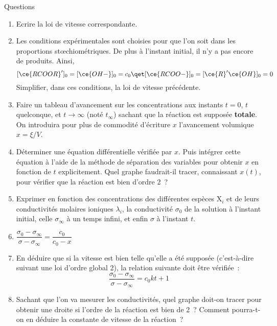 \documentclass[a4paper, 11pt, final, garamond]{book}
\begin{document}
\begin{rexem}{Questions}
    \begin{enumerate}[label=\sqenumi, start=4]
        \item Ecrire la loi de vitesse correspondante.
        \item Les conditions expérimentales sont choisies pour que l'on soit dans
            les proportions stœchiométriques. De plus à l'instant initial, il n'y a
            pas encore de produits. Ainsi, 
            \[[\ce{RCOOR}']_0 = [\ce{OH-}]_0 = c_0 \qet [\ce{RCOO-}]_0 = 
            [\ce{R}'\ce{OH}]_0 = 0\]
            Simplifier, dans ces conditions, la loi de vitesse précédente.
        \item Faire un tableau d'avancement sur les concentrations aux instants $t =
            0$, $t$ quelconque, et $t\to \infty$ (noté $t_\infty$) sachant que la
            réaction est supposée \textbf{totale}. On introduira pour plus de
            commodité d'écriture $x$ l'avancement volumique $x = \xi / V$.
        \item Déterminer une équation différentielle vérifiée par $x$. Puis intégrer
            cette équation à l'aide de la méthode de séparation des variables pour
            obtenir $x$ en fonction de $t$ explicitement. Quel graphe faudrait-il
            tracer, connaissant $x(t)$, pour vérifier que la réaction est bien
            d'ordre 2~?
        \item Exprimer en fonction des concentrations des différentes espèces X$_i$
            et de leurs conductivités molaires ioniques $\lambda_i$, la
            conductivité $\sigma_0$ de la solution à l'instant initial, celle
            $\sigma_\infty$ à un temps infini, et enfin $\sigma$ à l'instant $t$.
        \item {}
            {$\dfrac{\sigma_0-\sigma_\infty}{\sigma-\sigma_\infty} =
            \dfrac{c_0}{c_0-x}$}
        \item En déduire que si la vitesse est bien telle qu'elle a été supposée
            (c'est-à-dire suivant une loi d'ordre global 2), la relation suivante
            doit être vérifiée~: 
            \[\dfrac{\sigma_0-\sigma_\infty}{\sigma-\sigma_\infty} = c_0 k t +1\]
        \item Sachant que l'on va mesurer les conductivités, quel graphe doit-on
            tracer pour obtenir une droite si l'ordre de la réaction est bien de 2~?
            Comment pourra-t-on en déduire la constante de vitesse de la réaction~?
    \end{enumerate}
\end{rexem}
\end{document}
